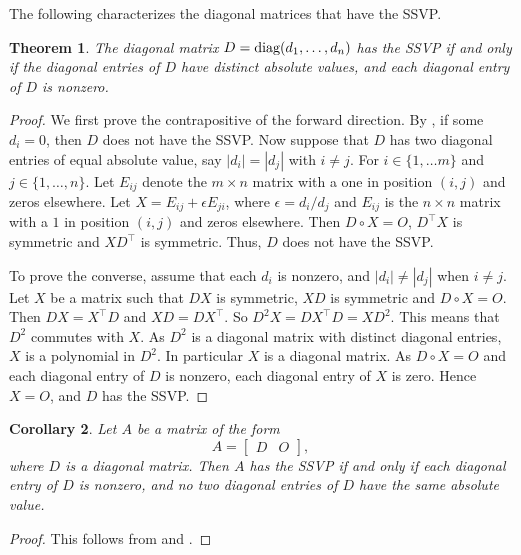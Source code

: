 \documentclass[preprint,12pt]{elsarticle}
\newcommand{\trans  }{^\top}
\newtheorem{theorem}{Theorem}[section]
\newtheorem{corollary}[theorem]{Corollary}
\begin{document}
The following characterizes the diagonal matrices that have the SSVP. 
\begin{theorem}
\label{Diagonal}
The diagonal matrix $D=\mbox{\rm diag}(d_1, \ldots, d_n)$ has the SSVP if and only if the diagonal entries of $D$ have 
distinct absolute values, and each diagonal entry of $D$ is nonzero. 
\end{theorem}

\begin{proof}
We first prove the contrapositive of the forward direction.  
By , if some $d_i=0$, then $D$ does not have the SSVP. 
Now suppose that  $D$ has two diagonal entries of equal absolute 
value, say $|d_{i}|=|d_{j}|$ with $i \neq j$. For $i \in \{1,\ldots m\} $ and $j \in \{1,\ldots, n\}$.  Let $E_{ij}$ denote the $m\times n$ matrix with a one in position $(i,j)$ and zeros elsewhere.
Let $X= E_{ij} + \epsilon E_{ji}$, where $\epsilon=d_i/d_j$ and $E_{ij}$ is the 
$n\times n$ matrix with a $1$ in position $(i,j)$ and zeros elsewhere. Then $D\circ X=O$, $D\trans X$ is symmetric and $XD\trans$
is symmetric.  Thus, $D$ does not have the SSVP. 

To prove the converse,  assume that  each $d_i$ is nonzero,  and $|d_i| \neq |d_j|$ when $i \neq j$.
Let $X$ be a matrix such that $DX$ is symmetric, $XD$ is symmetric and $D \circ X=O$.
Then $DX=X\trans  D$ and $XD= DX\trans $.
So $D^2X= DX\trans  D= XD^2$.  This means that $D^2$ commutes with $X$. 
As $D^2$ is a diagonal matrix with distinct diagonal entries, $X$ is a polynomial 
in $D^2$. In particular $X$ is a diagonal matrix.   As $D\circ X=O$ and each diagonal 
entry of $D$ is nonzero, each diagonal entry of $X$ is zero.  Hence $X=O$, and $D$ has the 
SSVP. 
\end{proof}


\begin{corollary}
\label{diagbord}
Let $A$ be a matrix of the form 
\[ 
A= \left[ \begin{array}{c|c} 
D & O
\end{array} 
\right], 
\]
where $D$ is a diagonal matrix.
Then $A$ has the SSVP if and only if 
each diagonal entry of $D$ is nonzero, and no two diagonal entries 
of $D$  have the same absolute value.
\end{corollary}


\begin{proof}
This follows from  and .
\end{proof}
\end{document}
